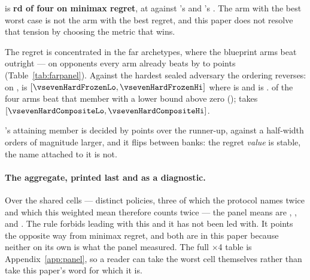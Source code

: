 \frozen{} is \textbf{\vsevenRegretFrozenRank{}rd of four on minimax regret}, at
\vsevenRegretFrozen{} against \vsevenRegretBest{}'s \vsevenRegretFcheap{} and \composite{}'s
\vsevenRegretComposite{}. The arm with the best worst case is not the arm with the best regret, and
this paper does not resolve that tension by choosing the metric that wins.

The regret is concentrated in the far archetypes, where the blueprint arms beat \frozen{} outright ---
on opponents every arm already beats by \vsevenFarSpanLo{} to \vsevenFarSpanHi{} points
(Table~\ref{tab:farpanel}). Against
the hardest sealed adversary the ordering reverses: on \vsevenHardSealed{}, \frozen{} is
\vsevenHardFrozen{} $[\vsevenHardFrozenLo, \vsevenHardFrozenHi]$ where \incumbent{} is
\vsevenHardIncumbent{} and \fcheap{} is \vsevenHardFcheap{}. \vsevenHardBeaters{} of the four arms beat that member with a lower bound above zero
(\vsevenHardBeaterNames{}); \composite{} takes \vsevenHardComposite{}
$[\vsevenHardCompositeLo, \vsevenHardCompositeHi]$.

\begin{table}[t]\centering
\caption{The far archetypes, where the regret difference lives. Every arm beats every one of these by between
\vsevenFarSpanLo{} and \vsevenFarSpanHi{} points; the differences between arms are what minimax regret is measuring.}
\label{tab:farpanel}
{\small}
\end{table}

\incumbent{}'s attaining member is decided by \vsevenRegretIncumbentGap{} points over the
runner-up, against a half-width orders of magnitude larger, and it flips between banks: the regret \emph{value} is
stable, the name attached to it is not.

\paragraph{The aggregate, printed last and as a diagnostic.}
Over the \vsevenPanelMembers{} shared cells --- \vsevenPanelDistinct{} distinct policies, three of
which the protocol names twice and which this weighted mean therefore counts twice --- the panel
means are \frozen{} \vsevenPanelMeanFrozen{},
\composite{} \vsevenPanelMeanComposite{}, \fcheap{} \vsevenPanelMeanFcheap{} and \incumbent{}
\vsevenPanelMeanIncumbent{}. The rule forbids leading with this and it has not been led with. It
points the opposite way from minimax regret, and both are in this paper because neither on its own
is what the panel measured. The full \vsevenPanelMembers{}$\times$4 table is
Appendix~\ref{app:panel}, so a reader can take the worst cell themselves rather than take this
paper's word for which it is.

